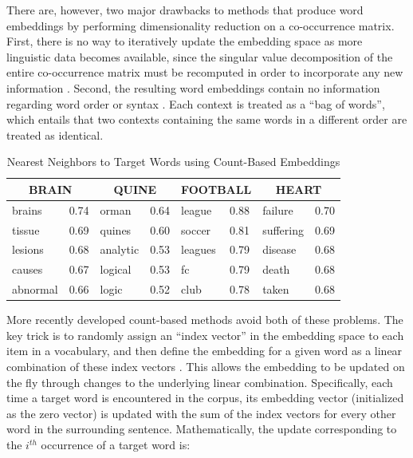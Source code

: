 There are, however, two major drawbacks to methods that produce word embeddings by performing dimensionality reduction on a co-occurrence matrix. First, there is no way to iteratively update the embedding space as more linguistic data becomes available, since the singular value decomposition of the entire co-occurrence matrix must be recomputed in order to incorporate any new information \citep{Sahlgren:2005}. Second, the resulting word embeddings contain no information regarding word order or syntax \citep{JonesMewhort:2007}. Each context is treated as a ``bag of words'', which entails that two contexts containing the same words in a different order are treated as identical. 

\begin{table}[!t]
\begin{center} 
\caption{Nearest Neighbors to Target Words using Count-Based Embeddings} 

\label{tab:nearestneighbors} 
\vskip 0.06in

\setlength{\tabcolsep}{13pt}
\begin{tabular}{llllllll} 
\hline

\multicolumn{2}{c}{\rule{0pt}{3ex} BRAIN} & 
\multicolumn{2}{c}{QUINE} & 
\multicolumn{2}{c}{FOOTBALL} & 
\multicolumn{2}{c}{HEART} \\
\hline
\rule{0pt}{3ex}brains & 0.74 & orman & 0.64 & league & 0.88 &
failure & 0.70  \\
tissue & 0.69 & quines & 0.60 & soccer & 0.81 &
suffering & 0.69  \\
lesions & 0.68 & analytic & 0.53 & leagues & 0.79 &
disease & 0.68  \\
causes & 0.67 & logical & 0.53 & fc & 0.79 &
death & 0.68  \\
abnormal & 0.66 & logic & 0.52 & club & 0.78 &
taken & 0.68  \\
\hline
\end{tabular} 
\end{center} 
\end{table}

More recently developed count-based methods avoid both of these problems. The key trick is to randomly assign an ``index vector'' in the embedding space to each item in a vocabulary, and then define the embedding for a given word as a linear combination of these index vectors \citep{JonesMewhort:2007,Sahlgren:2005,Sahlgren:2008}. This allows the embedding to be updated on the fly through changes to the underlying linear combination. Specifically, each time a target word is encountered in the corpus, its embedding vector (initialized as the zero vector) is updated with the sum of the index vectors for every other word in the surrounding sentence. Mathematically, the update corresponding to the $i^{th}$ occurrence of a target word is: 

